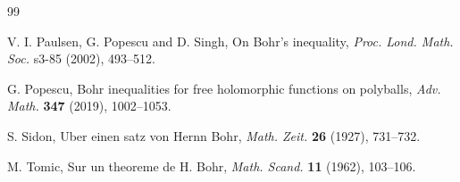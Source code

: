 \documentclass[a4paper,12pt]{amsart}
\theoremstyle{definition}
\begin{document}
\begin{thebibliography}{99}
	

	
	 {\sc V. I. Paulsen, G. Popescu} and {\sc D. Singh}, On Bohr's inequality, {\it Proc. Lond. Math. Soc.} s3-85 (2002), 493--512.
	
	

	 {\sc G. Popescu}, Bohr inequalities for free holomorphic functions on polyballs, {\it Adv. Math.} {\bf 347} (2019), 1002--1053.
	
	 {\sc S. Sidon}, Uber einen satz von Hernn Bohr, {\it Math. Zeit.}  {\bf 26} (1927),  731--732.
	
	 {\sc M. Tomic}, Sur un theoreme de H. Bohr,  {\it Math. Scand.}  {\bf 11} (1962), 103--106.

\end{thebibliography}
\end{document}
